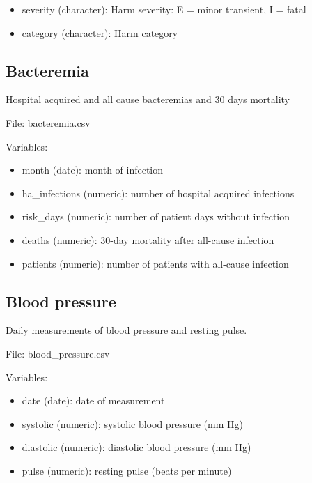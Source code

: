 \documentclass[
]{book}
\providecommand{\tightlist}{%
  \setlength{\itemsep}{0pt}\setlength{\parskip}{0pt}}
\begin{document}
\begin{itemize}
\tightlist
\item
  severity (character): Harm severity: E = minor transient, I = fatal
\item
  category (character): Harm category
\end{itemize}

\subsection*{Bacteremia}\label{bacteremia}

Hospital acquired and all cause bacteremias and 30 days mortality

File: bacteremia.csv

Variables:

\begin{itemize}
\tightlist
\item
  month (date): month of infection
\item
  ha\_infections (numeric): number of hospital acquired infections
\item
  risk\_days (numeric): number of patient days without infection
\item
  deaths (numeric): 30-day mortality after all-cause infection
\item
  patients (numeric): number of patients with all-cause infection
\end{itemize}

\subsection*{Blood pressure}\label{blood-pressure}

Daily measurements of blood pressure and resting pulse.

File: blood\_pressure.csv

Variables:

\begin{itemize}
\tightlist
\item
  date (date): date of measurement
\item
  systolic (numeric): systolic blood pressure (mm Hg)
\item
  diastolic (numeric): diastolic blood pressure (mm Hg)
\item
  pulse (numeric): resting pulse (beats per minute)
\end{itemize}
\end{document}
